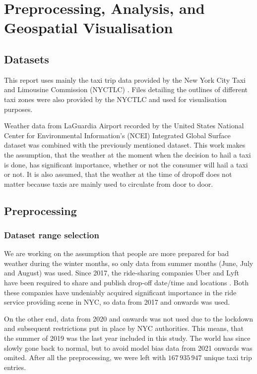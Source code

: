 \documentclass[11pt]{article}
\begin{document}
\section{Preprocessing, Analysis, and Geospatial Visualisation}

\subsection{Datasets}
This report uses mainly the taxi trip data provided by the New York City Taxi and Limousine Commission (NYCTLC) \cite{nyctlcData}. Files detailing the outlines of different taxi zones were also provided by the NYCTLC and used for visualisation purposes.

Weather data from LaGuardia Airport recorded by the United States National Center for Environmental Information's (NCEI) Integrated Global Surface dataset \cite{weatherData} was combined with the previously mentioned dataset. This work makes the assumption, that the weather at the moment when the decision to hail a taxi is done, has significant importance, whether or not the consumer will hail a taxi or not. It is also assumed, that the weather at the time of dropoff does not matter because taxis are mainly used to circulate from door to door.

\subsection{Preprocessing}

\subsubsection{Dataset range selection}

We are working on the assumption that people are more prepared for bad weather during the winter months, so only data from summer months (June, July and August) was used. Since 2017, the ride-sharing companies Uber and Lyft have been required to share and publish drop-off date/time and locations \cite{tripUserGuide}. Both these companies have undeniably acquired significant importance in the ride service providing scene in NYC, so data from 2017 and onwards was used. 

On the other end, data from 2020 and onwards was not used due to the lockdown and subsequent restrictions put in place by NYC authorities. This means, that the summer of 2019 was the last year included in this study. The world has since slowly gone back to normal, but to avoid model bias data from 2021 onwards was omited. After all the preprocessing, we were left with $167\,935\,947$ unique taxi trip entries.
\end{document}
